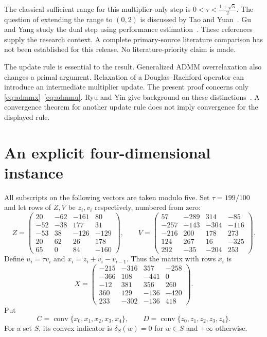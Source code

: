 \documentclass[11pt,a4paper]{article}
\theoremstyle{remark}
\newcommand{\conv}{\operatorname{conv}}
\newcommand{\phig}{\frac{1+\sqrt5}{2}}
\begin{document}
The classical sufficient range for this multiplier-only step is
$0<\tau<\phig$. The question of extending the range to $(0,2)$ is
discussed by Tao and Yuan~\cite{TaoYuan}. Gu and Yang study the dual
step using performance estimation~\cite{GuYang}. These references supply
the research context. A complete primary-source literature comparison has not been established
for this release. No literature-priority claim is made.

The update rule is essential to the result. Generalized ADMM overrelaxation
also changes a primal argument. Relaxation of a Douglas--Rachford operator
can introduce an intermediate multiplier update. The present proof concerns
only \eqref{eq:admmx}--\eqref{eq:admmu}. Ryu and Yin give background on
these distinctions~\cite{RyuYin}. A convergence theorem for another update
rule does not imply convergence for the displayed rule.

\section{An explicit four-dimensional instance}
All subscripts on the following vectors are taken modulo five. Set $\tau=199/100$ and let rows of $Z,V$ be $z_i,v_i$ respectively, numbered from zero:
\begin{equation}\label{eq:dataZ}
Z=\begin{pmatrix}
20&-62&-161&80\\-52&-38&177&31\\-53&38&-126&-129\\20&62&26&178\\65&0&84&-160
\end{pmatrix},\qquad
V=\begin{pmatrix}
57&-289&314&-85\\-257&-143&-304&-116\\-216&200&178&273\\124&267&16&-325\\292&-35&-204&253
\end{pmatrix}.
\end{equation}
Define $u_i=\tau v_i$ and $x_i=z_i+v_i-v_{i-1}$. Thus the matrix with rows $x_i$ is
\begin{equation}\label{eq:dataX}
X=\begin{pmatrix}
-215&-316&357&-258\\-366&108&-441&0\\-12&381&356&260\\360&129&-136&-420\\233&-302&-136&418
\end{pmatrix}.
\end{equation}
Put
\begin{equation}\label{eq:sets}
C=\conv\{x_0,x_1,x_2,x_3,x_4\},\qquad
D=\conv\{z_0,z_1,z_2,z_3,z_4\}.
\end{equation}
For a set $S$, its convex indicator is $\delta_S(w)=0$ for $w\in S$ and $+\infty$ otherwise.
\end{document}
